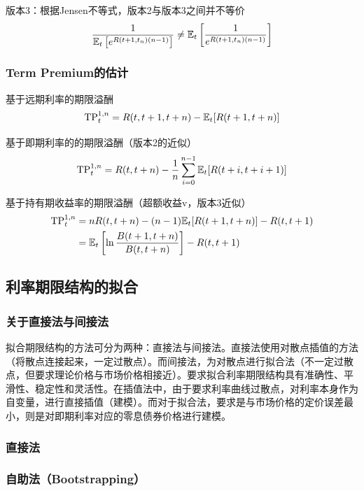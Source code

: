 \documentclass[11pt]{article}
\begin{document}
版本3：根据Jensen不等式，版本2与版本3之间并不等价
\begin{equation*}
	\frac{1}{\mathbb{E}_t\left[e^{R(t+1,t_n)(n-1)}\right]}
	\neq \mathbb{E}_t \left[\frac{1}{e^{R(t+1,t_n)(n-1)}}\right]
\end{equation*}

\subsubsection{Term Premium的估计}

基于远期利率的期限溢酬
\begin{equation*}
	\text{TP}_t^{1,n} = R(t,t+1,t+n) - \mathbb{E}_t[R(t+1,t+n)]
\end{equation*}

基于即期利率的的期限溢酬（版本2的近似）
\begin{equation*}
	\text{TP}_t^{1,n} = R(t,t+n) - \frac{1}{n} \sum^{n-1}_{i=0} \mathbb{E}_t[R(t+i,t+i+1)]
\end{equation*}

基于持有期收益率的期限溢酬（超额收益v，版本3近似）
\begin{align*}
	\text{TP}_t^{1,n} &= n R(t,t+n) - (n-1)\mathbb{E}_t[R(t+1,t+n)] - R(t,t+1) \\
	&= \mathbb{E}_t \left[\ln \frac{B(t+1,t+n)}{B(t,t+n)} \right] - R(t,t+1)
\end{align*}

\subsection{利率期限结构的拟合}

\subsubsection{关于直接法与间接法}

拟合期限结构的方法可分为两种：直接法与间接法。直接法使用对散点插值的方法（将散点连接起来，一定过散点）。而间接法，为对散点进行拟合法（不一定过散点，但要求理论价格与市场价格相接近）。要求拟合利率期限结构具有准确性、平滑性、稳定性和灵活性。在插值法中，由于要求利率曲线过散点，对利率本身作为自变量，进行直接插值（建模）。而对于拟合法，要求是与市场价格的定价误差最小，则是对即期利率对应的零息债券价格进行建模。

\subsubsection{直接法}

\subsubsection*{自助法（Bootstrapping）}
\end{document}

